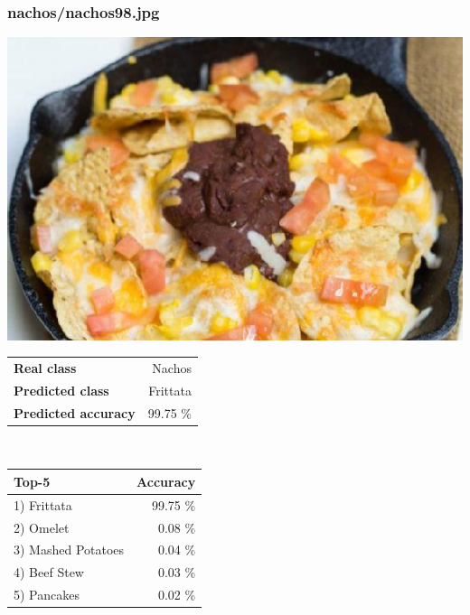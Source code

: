 \subsubsection{nachos/nachos98.jpg}

\begin{minipage}[t]{0.4\textwidth}
	\vspace{0pt}
	\includegraphics[width=\linewidth]{images/evaluation-images/nachos/nachos98.jpg}
\end{minipage}
\hfill
\begin{minipage}[t]{0.5\textwidth}
	\vspace{0pt}\raggedright
	\begin{tabularx}{\textwidth}{X r}
		\small \textbf{Real class} & \small Nachos\\
		\small \textbf{Predicted class} & \small Frittata\\
		\small \textbf{Predicted accuracy} & \small 99.75 \%
    \end{tabularx}\\
    
    \vspace{6pt}
	\begin{tabularx}{\textwidth}{X r}
        \small \textbf{Top-5} & \small \textbf{Accuracy} \\
        \hline
		\small 1) Frittata & \small 99.75 \%\\\small 2) Omelet & \small 0.08 \%\\\small 3) Mashed Potatoes & \small 0.04 \%\\\small 4) Beef Stew & \small 0.03 \%\\\small 5) Pancakes & \small 0.02 \%
    \end{tabularx}
\end{minipage}
    
